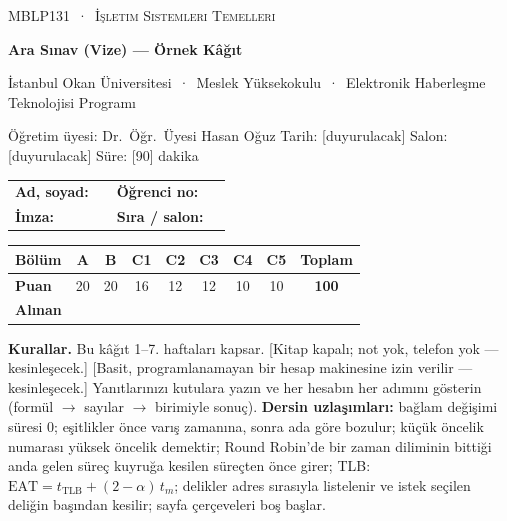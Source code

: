 \documentclass[11pt,a4paper]{article}
\begin{document}
\thispagestyle{empty}
\begin{tcolorbox}[enhanced,colback=dark,colframe=dark,arc=0pt,boxrule=0pt,
  left=18pt,right=18pt,top=14pt,bottom=14pt,coltext=white]
{\small\color{mint}\textsc{MBLP131 \,·\, İşletim Sistemleri Temelleri}}\par\smallskip
{\headfont\fontsize{22}{26}\selectfont\bfseries Ara Sınav (Vize) --- Örnek Kâğıt}\par\smallskip
{\small İstanbul Okan Üniversitesi \,·\, Meslek Yüksekokulu \,·\, Elektronik Haberleşme Teknolojisi Programı}\par
{\small Öğretim üyesi: Dr.\ Öğr.\ Üyesi Hasan Oğuz \quad Tarih: [duyurulacak] \quad Salon: [duyurulacak] \quad Süre: [90] dakika}
\end{tcolorbox}

\begin{center}
\renewcommand{\arraystretch}{1.6}
\begin{tabularx}{\linewidth}{@{}lX lX@{}}
\textbf{Ad, soyad:} & \hrulefill & \textbf{Öğrenci no:} & \hrulefill \\
\textbf{İmza:} & \hrulefill & \textbf{Sıra / salon:} & \hrulefill \\
\end{tabularx}

\vspace{0.4em}
\renewcommand{\arraystretch}{1.35}
\begin{tabular}{|l|c|c|c|c|c|c|c|c|}
\hline
\textbf{Bölüm} & A & B & C1 & C2 & C3 & C4 & C5 & \textbf{Toplam} \\ \hline
\textbf{Puan} & 20 & 20 & 16 & 12 & 12 & 10 & 10 & \textbf{100} \\ \hline
\textbf{Alınan} & & & & & & & & \\[0.4em] \hline
\end{tabular}
\end{center}

\textbf{Kurallar.} Bu kâğıt 1--7. haftaları kapsar. [Kitap kapalı; not yok, telefon yok --- kesinleşecek.] [Basit, programlanamayan bir hesap makinesine izin verilir --- kesinleşecek.] Yanıtlarınızı kutulara yazın ve her hesabın her adımını gösterin (formül $\to$ sayılar $\to$ birimiyle sonuç). \textbf{Dersin uzlaşımları:} bağlam değişimi süresi $0$; eşitlikler önce varış zamanına, sonra ada göre bozulur; küçük öncelik numarası yüksek öncelik demektir; Round Robin'de bir zaman diliminin bittiği anda gelen süreç kuyruğa kesilen süreçten önce girer; TLB: $\text{EAT} = t_{\text{TLB}} + (2-\alpha)\,t_m$; delikler adres sırasıyla listelenir ve istek seçilen deliğin başından kesilir; sayfa çerçeveleri boş başlar.
\end{document}
